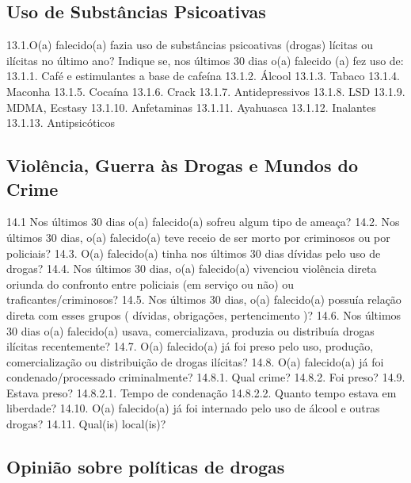 \subsection{Uso de Substâncias Psicoativas}

13.1.O(a) falecido(a) fazia uso de substâncias psicoativas (drogas) lícitas ou ilícitas no último ano?
Indique se, nos últimos 30 dias o(a) falecido (a) fez uso de:
13.1.1. Café e estimulantes a base de cafeína
13.1.2. Álcool
13.1.3. Tabaco
13.1.4. Maconha
13.1.5. Cocaína
13.1.6. Crack
13.1.7. Antidepressivos
13.1.8. LSD
13.1.9. MDMA, Ecstasy
13.1.10. Anfetaminas
13.1.11. Ayahuasca
13.1.12. Inalantes
13.1.13. Antipsicóticos


\subsection{Violência, Guerra às Drogas e Mundos do Crime}

14.1 Nos últimos 30 dias o(a) falecido(a) sofreu algum tipo de ameaça?
14.2. Nos últimos 30 dias, o(a) falecido(a) teve receio de ser morto por criminosos ou por policiais?
14.3. O(a) falecido(a) tinha nos últimos 30 dias dívidas pelo uso de drogas?
14.4. Nos últimos 30 dias, o(a) falecido(a) vivenciou violência direta oriunda do confronto entre policiais (em serviço ou não) ou traficantes/criminosos?
14.5. Nos últimos 30 dias, o(a) falecido(a) possuía relação direta com esses grupos ( dívidas, obrigações, pertencimento )?
14.6. Nos últimos 30 dias o(a) falecido(a) usava, comercializava, produzia ou distribuía drogas ilícitas recentemente?
14.7. O(a) falecido(a) já foi preso pelo uso, produção, comercialização ou distribuição de drogas ilícitas?
14.8. O(a) falecido(a) já foi condenado/processado criminalmente?
14.8.1. Qual crime?
14.8.2. Foi preso?
14.9. Estava preso?
14.8.2.1. Tempo de condenação
14.8.2.2. Quanto tempo estava em liberdade?
14.10. O(a) falecido(a) já foi internado pelo uso de álcool e outras drogas?
14.11. Qual(is) local(is)?

\subsection{Opinião sobre políticas de drogas}

